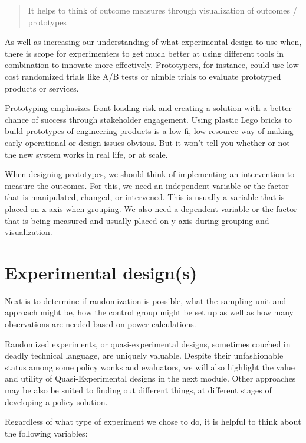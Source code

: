 \documentclass[]{book}
\begin{document}
\begin{quote}
It helps to think of outcome measures through visualization of outcomes / prototypes
\end{quote}

As well as increasing our understanding of what experimental design to use when, there is scope for experimenters to get much better at using different tools in combination to innovate more effectively. Prototypers, for instance, could use low-cost randomized trials like A/B tests or nimble trials to evaluate prototyped products or services.

Prototyping emphasizes front-loading risk and creating a solution with a better chance of success through stakeholder engagement. Using plastic Lego bricks to build prototypes of engineering products is a low-fi, low-resource way of making early operational or design issues obvious. But it won't tell you whether or not the new system works in real life, or at scale.

When designing prototypes, we should think of implementing an intervention to measure the outcomes. For this, we need an independent variable or the factor that is manipulated, changed, or intervened. This is usually a variable that is placed on x-axis when grouping. We also need a dependent variable or the factor that is being measured and usually placed on y-axis during grouping and visualization.

\hypertarget{experimental-designs}{%
\section{Experimental design(s)}\label{experimental-designs}}

Next is to determine if randomization is possible, what the sampling unit and approach might be, how the control group might be set up as well as how many observations are needed based on power calculations.

Randomized experiments, or quasi-experimental designs, sometimes couched in deadly technical language, are uniquely valuable. Despite their unfashionable status among some policy wonks and evaluators, we will also highlight the value and utility of Quasi-Experimental designs in the next module. Other approaches may be also be suited to finding out different things, at different stages of developing a policy solution.

Regardless of what type of experiment we chose to do, it is helpful to think about the following variables:
\end{document}
